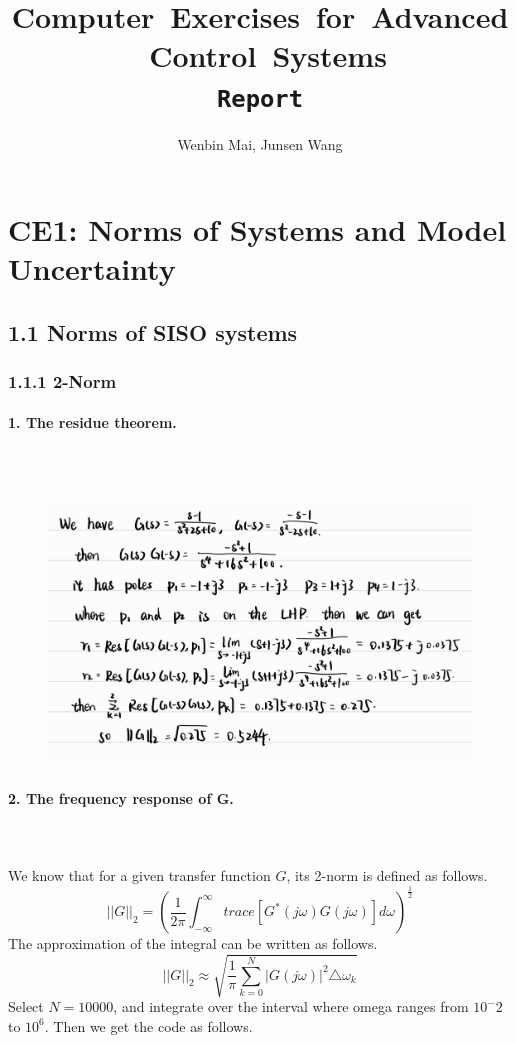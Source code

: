 \documentclass{article}
\title{\mbox{Computer Exercises for Advanced Control Systems}\\ \texttt{Report}}
\author{Wenbin Mai, Junsen Wang}
\begin{document}
\maketitle

\section*{CE1: Norms of Systems and Model Uncertainty}
\subsection*{1.1 Norms of SISO systems}
\subsubsection*{1.1.1 2-Norm}
\paragraph{1. The residue theorem.}~\\~\\
\begin{figure}[h]
    \centering
    \includegraphics[width=0.8\linewidth]{t1_1_1_1.jpg}
\end{figure}


\paragraph{2. The frequency response of G.}~\\~\\
We know that for a given transfer function $G$, its 2-norm is defined as follows.
\[||G||_2=(\frac{1}{2\pi}\int^{\infty}_{-\infty}trace[G^*(j\omega)G(j\omega)]d\omega)^{\frac{1}{2}}\]
The approximation of the integral can be written as follows.
\[||G||_2\approx\sqrt{\frac{1}{\pi}\sum^{N}_{k=0}|G(j\omega)|^2\triangle\omega_k}\]
Select $N=10000$, and integrate over the interval where omega ranges from $10^-2$ to $10^6$. Then we get the code as follows.
\end{document}
